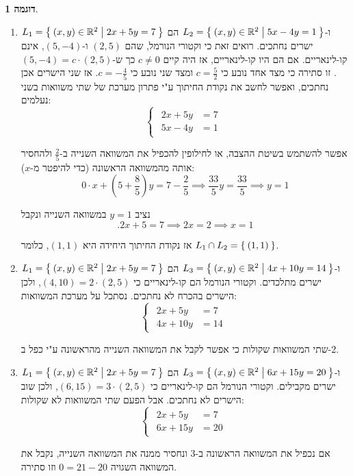\documentclass[12pt]{report}
\theoremstyle{plain}
\theoremstyle{definition}
\newtheorem{example}{דוגמה}[chapter]
\newcommand{\R}{\mathbb{R}}
\newcommand{\0}{\mathbf{0}}
\begin{document}
\begin{example}\
\begin{enumerate}[label=\alph*.]
\item $L_1=\Set{(x,y)\in\R^2|2x+5y=7}$ ו-$L_2=\Set{(x,y)\in\R^2|5x-4y=1}$
הם ישרים נחתכים. רואים זאת כי וקטורי הנורמל, שהם $(2,5)$ ו-$(5,-4)$,
אינם קו-לינאריים. אם הם היו קו-לינאריים, אז היה קיים $c\neq0$
כך ש-$(5,-4)=c\cdot(2,5)$. זו סתירה כי מצד אחד נובע כי $c=\frac{5}{2}$
ומצד שני נובע כי $c=-\frac{4}{5}$. אז שני הישרים אכן נחתכים,
ואפשר לחשב את נקודת החיתוך ע"י פתרון מערכת של שתי משוואות
בשני נעלמים:
$$	
	\begin{cases}
    \begin{aligned}
		2x+5y&=7\\
		5x-4y&=1
        \end{aligned}
	\end{cases}	
$$

אפשר להשתמש בשיטת ההצבה, או לחילופין להכפיל את המשוואה השנייה ב-$\frac{2}{5}$
ולהחסיר אותה מהמשוואה הראשונה (כדי להיפטר מ-$x$):
$$	
	0\cdot x+(5+\frac{8}{5})y=7-\frac{2}{5}\implies\frac{33}{5}y=\frac{33}{5}\implies y=1	
$$

נציב $y=1$ במשוואה השנייה ונקבל 
$$	
	.2x+5=7\implies2x=2\implies x=1	
$$

אז נקודת החיתוך היחידה היא $(1,1)$, כלומר $L_1\cap L_2=\Set{(1,1)}$.

\item $L_1=\Set{(x,y)\in\R^2|2x+5y=7}$ ו-$L_3=\Set{(x,y)\in\R^2|4x+10y=14}$
הם ישרים מתלכדים. וקטורי הנורמל הם קו-לינאריים כי $(4,10)=2\cdot(2,5)$,
ולכן הישרים בהכרח לא נחתכים. נסתכל על מערכת המשוואות:
$$	
	\begin{cases}
    \begin{aligned}
		2x+5y&=7\\
		4x+10y&=14
        \end{aligned}
	\end{cases}	
$$

שתי המשוואות שקולות כי אפשר לקבל את המשוואה השנייה מהראשונה ע"י
כפל ב-$2$.

\item $L_1=\Set{(x,y)\in\R^2|2x+5y=7}$ ו-$L_3=\Set{(x,y)\in\R^2|6x+15y=20}$
הם ישרים מקבילים. וקטורי הנורמל הם קו-לינאריים כי $(6,15)=3\cdot(2,5)$,
ולכן שוב הישרים לא נחתכים. אבל הפעם שתי המשוואות לא שקולות:
$$	
	\begin{cases}
    \begin{aligned}
		2x+5y&=7\\
		6x+15y&=20
        \end{aligned}
	\end{cases}	
$$

אם נכפיל את המשוואה הראשונה ב-$3$ ונחסיר ממנה את המשוואה השנייה, נקבל את המשוואה השגויה
$0=21-20$
וזו סתירה. 
\end{enumerate}
\end{example}
\end{document}
